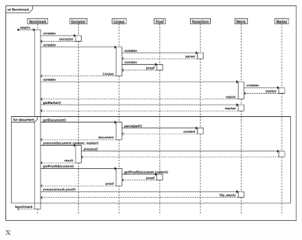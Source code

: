 \documentclass[12pt, a4paper]{article}
\begin{document}
\begin{figure}[htb!]
  \begin{center}
  \includegraphics[width=14cm]{img/fastbenchmark.eps}
  \caption{x}
  \label{x}
  \end{center}
\end{figure}
\end{document}
